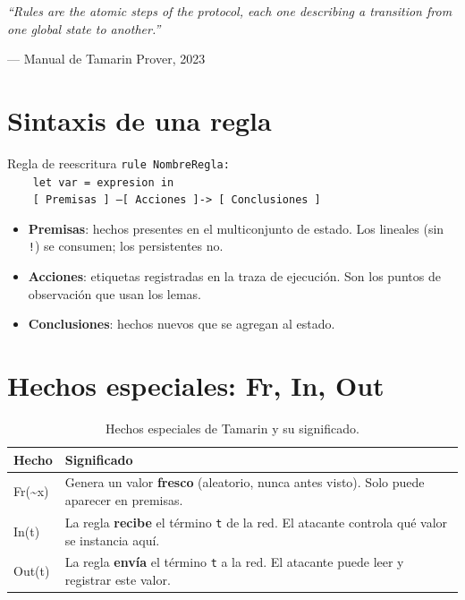 \documentclass[12pt, a4paper, twoside, openright]{book}
\begin{document}
\epigraph{%
  \textit{``Rules are the atomic steps of the protocol, each one
  describing a transition from one global state to another.''}
}{--- Manual de Tamarin Prover, 2023}

\section{Sintaxis de una regla}

\begin{cajaSintaxis}{Regla de reescritura}
  \texttt{rule NombreRegla:}\\
  \texttt{\ \ \ \ let var = expresion in}\\
  \texttt{\ \ \ \ [ Premisas ] --[ Acciones ]-> [ Conclusiones ]}
\end{cajaSintaxis}

\begin{itemize}[leftmargin=*, itemsep=6pt]
  \item \textbf{Premisas}: hechos presentes en el multiconjunto de estado.
    Los lineales (sin \texttt{!}) se consumen; los persistentes no.
  \item \textbf{Acciones}: etiquetas registradas en la traza de ejecuci\'on.
    Son los puntos de observaci\'on que usan los lemas.
  \item \textbf{Conclusiones}: hechos nuevos que se agregan al estado.
\end{itemize}

\section{Hechos especiales: Fr, In, Out}

\begin{table}[H]
\centering
\caption{Hechos especiales de Tamarin y su significado.}
\label{tab:hechos-esp}
\begin{tabular}{>{\ttfamily}p{3.2cm} p{9.5cm}}
\toprule
\normalfont Hecho & Significado \\
\midrule
Fr(\textasciitilde x) &
  Genera un valor \textbf{fresco} (aleatorio, nunca antes visto).
  Solo puede aparecer en premisas. \\[4pt]
In(t) &
  La regla \textbf{recibe} el t\'ermino \texttt{t} de la red.
  El atacante controla qu\'e valor se instancia aqu\'i. \\[4pt]
Out(t) &
  La regla \textbf{env\'ia} el t\'ermino \texttt{t} a la red.
  El atacante puede leer y registrar este valor. \\
\bottomrule
\end{tabular}
\end{table}
\end{document}
